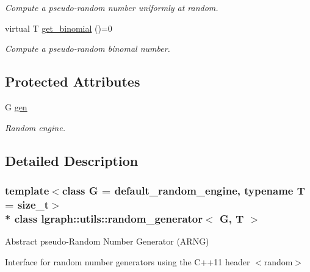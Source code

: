 \begin{DoxyCompactItemize}
\begin{DoxyCompactList}\small\item\em Compute a pseudo-\/random number uniformly at random. \end{DoxyCompactList}\item 
virtual T \hyperlink{classlgraph_1_1utils_1_1random__generator_a721da14c38e38d28559e8c617e0bdde2}{get\+\_\+binomial} ()=0\hypertarget{classlgraph_1_1utils_1_1random__generator_a721da14c38e38d28559e8c617e0bdde2}{}\label{classlgraph_1_1utils_1_1random__generator_a721da14c38e38d28559e8c617e0bdde2}

\begin{DoxyCompactList}\small\item\em Compute a pseudo-\/random binomal number. \end{DoxyCompactList}\end{DoxyCompactItemize}
\subsection*{Protected Attributes}
\begin{DoxyCompactItemize}
\item 
G \hyperlink{classlgraph_1_1utils_1_1random__generator_a18353876b4c2d3a18aee454b5750a0a0}{gen}\hypertarget{classlgraph_1_1utils_1_1random__generator_a18353876b4c2d3a18aee454b5750a0a0}{}\label{classlgraph_1_1utils_1_1random__generator_a18353876b4c2d3a18aee454b5750a0a0}

\begin{DoxyCompactList}\small\item\em Random engine. \end{DoxyCompactList}\end{DoxyCompactItemize}


\subsection{Detailed Description}
\subsubsection*{template$<$class G = default\+\_\+random\+\_\+engine, typename T = size\+\_\+t$>$\\*
class lgraph\+::utils\+::random\+\_\+generator$<$ G, T $>$}

Abstract pseudo-\/\+Random Number Generator (A\+R\+NG) 

Interface for random number generators using the C++11 header $<$random$>$


